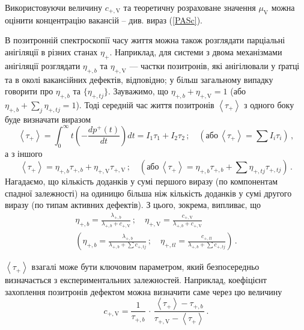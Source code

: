 Використовуючи  величину $c_{+,\mathrm{V}}$ та теоретичну розраховане значення $\mu_\mathrm{V}$
можна оцінити концентрацію вакансій -- див. вираз (\ref{PASc}).


В позитронній спектроскопії часу життя можна також розглядати
парціальні анігіляції в різних станах $\eta_+$.
Наприклад,
для системи з двома механізмами анігіляції
розглядати $\eta_{+,b}$ та $\eta_{+,\mathrm{V}}$ ---
частки позитронів, які анігілювали у ґратці та в околі вакансійних
дефектів, відповідно;
у більш загальному випадку говорити про $\eta_{+,b}$ та $\{\eta_{+,tj}\}$.
Зауважимо, що $\eta_{+,b}+\eta_{+,\mathrm{V}}=1$
(або $\eta_{+,b}+\sum_j\eta_{+,tj}=1$).
Тоді середній час життя позитронів $\left\langle\tau_+\right\rangle$
з одного боку буде визначати виразом
\begin{equation*}
\left\langle\tau_+\right\rangle=\int_0^\infty t\left(-\frac{dp^+(t)}{dt}\right)dt=I_1\tau_{1}+I_2\tau_{2}\,;
\quad\left(\text{або}\,\left\langle\tau_+\right\rangle=\sum I_i \tau_{i}\right)\,,
\end{equation*}
а з іншого
\begin{equation*}
\left\langle\tau_+\right\rangle=\eta_{+,b}\tau_{+,b}+\eta_{+,\mathrm{V}}\tau_{+,\mathrm{V}}\,;
\quad\left(\text{або}\,\left\langle\tau_+\right\rangle=\eta_{+,b}\tau_{+,b}+\sum \eta_{+,tj}\tau_{+,tj}\right)\,.
\end{equation*}
Нагадаємо, що кількість доданків у сумі першого виразу (по компонентам спадної залежності) на
одиницю більша ніж кількість доданків у сумі другого виразу (по типам активних дефектів).
З цього, зокрема, випливає, що
\begin{gather*}
\eta_{+,b}=\frac{\lambda_{+,b}}{\lambda_{+,b}+c_{+,\mathrm{V}}}\,;\quad
\eta_{+,\mathrm{V}}=\frac{c_{+,\mathrm{V}}}{\lambda_{+,b}+c_{+,\mathrm{V}}} \\
\left(\eta_{+,b}=\frac{\lambda_{+,b}}{\lambda_{+,b}+\sum c_{+,tj}}\,;\quad
\eta_{+,tl}=\frac{c_{+,tl}}{\lambda_{+,b}+\sum c_{+,tj}} \right)\,.
\end{gather*}

$\left\langle\tau_+\right\rangle$ взагалі може бути ключовим параметром,
який безпосередньо визначається з експериментальних залежностей.
Наприклад, коефіцієнт захоплення позитронів дефектом можна визначити саме через цю величину
\begin{equation*}
c_{+,\mathrm{V}}=\frac{1}{\tau_{+,b}}\,\cdot\,\frac{\left\langle\tau_+\right\rangle-\tau_{+,b}}{\tau_{+,\mathrm{V}}-\left\langle\tau_+\right\rangle}\,.
\end{equation*}


